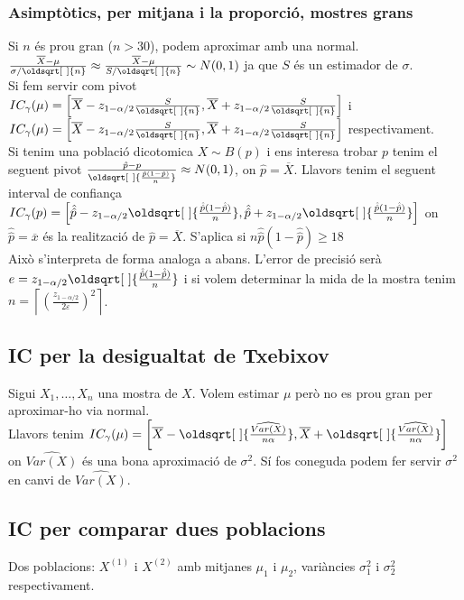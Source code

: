 \documentclass[a4paper]{sciposter}
\renewcommand*{\sqrt}[2][\ ]{\oldsqrt[#1]{#2} }
\begin{document}
\begin{multicols}{3}
\subsubsection{Asimptòtics, per mitjana i la proporció, mostres grans}
Si $n$ és prou gran ($n>30$), podem aproximar amb una normal.\\
$\frac{\overline{X}-\mu}{\sigma/\sqrt{n}} \approx \frac{\overline{X}-\mu}{S/\sqrt{n}} \sim N(0,1)$ ja que $S$ és un estimador de $\sigma$.\\
Si fem servir com pivot $IC_\gamma(\mu) = \left[\overline{X} - z_{1-\alpha/2}\frac{S}{\sqrt{n}}, \overline{X} + z_{1-\alpha/2}\frac{S}{\sqrt{n}}\right]$ i $IC_\gamma(\mu) = \left[\overline{X} - z_{1-\alpha/2}\frac{S}{\sqrt{n}}, \overline{X} + z_{1-\alpha/2}\frac{S}{\sqrt{n}}\right]$ respectivament.\\
Si tenim una població dicotomica $X \sim B(p)$ i ens interesa trobar $p$ tenim el seguent pivot $\frac{\hat{p}-p}{\sqrt{\frac{\hat{p}(1-\hat{p})}{n}}} \approx N(0,1)$, on $\hat{p} = \overline{X}$. Llavors tenim el seguent interval de confiança $IC_\gamma(p) = \left[\hat{\hat{p}}-z_{1-\alpha/2}\sqrt{\frac{\hat{\hat{p}}(1-\hat{\hat{p}})}{n}}, \hat{\hat{p}}+z_{1-\alpha/2}\sqrt{\frac{\hat{\hat{p}}(1-\hat{\hat{p}})}{n}}\right]$ on $\hat{\hat{p}} = \overline{x}$ és la realització de $\hat{p} = \overline{X}$. S'aplica si $n\hat{\hat{p}}(1-\hat{\hat{p}}) \geq 18$\\
Això s'interpreta de forma analoga a abans. L'error de precisió serà $e = z_{1-\alpha/2}\sqrt{\frac{\hat{\hat{p}}(1-\hat{\hat{p}})}{n}}$ i si volem determinar la mida de la mostra tenim $n = \left\lceil\left(\frac{z_{1-\alpha/2}}{2\varepsilon}\right)^2\right\rceil$.
\subsection{IC per la desigualtat de Txebixov}
Sigui $X_1, \ldots, X_n$ una mostra de $X$. Volem estimar $\mu$ però no es prou gran per aproximar-ho via normal.\\
Llavors tenim $IC_\gamma(\mu) = \left[\overline{X} - \sqrt{\frac{\widehat{Var(X)}}{n\alpha}}, \overline{X} + \sqrt{\frac{\widehat{Var(X)}}{n\alpha}}\right]$ on $\widehat{Var(X)}$ és una bona aproximació de $\sigma^2$. Sí fos coneguda podem fer servir $\sigma^2$ en canvi de $\widehat{Var(X)}$.
\subsection{IC per comparar dues poblacions}
Dos poblacions: $X^{(1)}$ i $X^{(2)}$ amb mitjanes $\mu_1$ i $\mu_2$, variàncies $\sigma_1^2$ i $\sigma_2^2$ respectivament.\\

\end{multicols}
\end{document}
